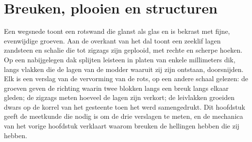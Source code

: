 \chapter{Breuken, plooien en structuren}\label{ch:b1:faults-folds-fabrics}

Een wegsnede toont een rotswand die glanst als glas en is bekrast met fijne, evenwijdige groeven. Aan de overkant van het dal toont een zeeklif lagen zandsteen en schalie die tot zigzags zijn geplooid, met rechte  en scherpe hoeken. Op een nabijgelegen dak splijten leisteen in platen van enkele millimeters dik, langs vlakken die de lagen van de modder waaruit zij zijn ontstaan, doorsnijden. Elk is een verslag van de vervorming van de rots, op een andere schaal gelezen: de groeven geven de richting waarin twee blokken langs een breuk langs elkaar gleden; de zigzags meten hoeveel de lagen zijn verkort; de leivlakken groeiden dwars op de korrel van het gesteente toen het werd samengedrukt. Dit hoofdstuk geeft de meetkunde die nodig is om de drie verslagen te meten, en de mechanica van het vorige hoofdstuk verklaart waarom breuken de hellingen hebben die zij hebben.

